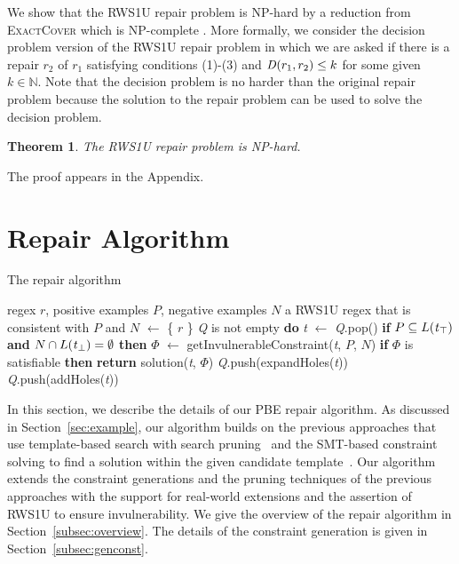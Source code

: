\documentclass[conference]{IEEEtran}
\newcommand{\distfunc}{{\it D}}
\newcommand{\queue}{{\it Q}}
\newcommand{\idt}{\hspace{0.5cm}}
\newcommand{\sstate}{{\it t}}
\newcommand{\ltp}{RWS1U}
\newcommand{\supplementary}{Appendix} \newcommand{\Supplementary}{Appendix} \newtheorem{definition}{Definition}[section]
\newtheorem{theorem}{Theorem}[section]
\begin{document}
We show that the \ltp{} repair problem is NP-hard by a reduction from \textsc{ExactCover} which is NP-complete \cite{Karp1972}.  More formally, we consider the decision problem version of the \ltp{} repair problem in which we are asked if there is a repair $r_2$ of $r_1$ satisfying conditions (1)-(3) and $\distfunc{}(r_1,r_2) \leq k$ for some given $k \in \mathbb{N}$.  Note that the decision problem is no harder than the original repair problem because the solution to the repair problem can be used to solve the decision problem.
\begin{theorem}
\label{theo:nphardness}
The \ltp{} repair problem is NP-hard.
\end{theorem}
The proof appears in the \supplementary{}.







  
\section{Repair Algorithm}
\label{sec:algo}


\begin{algorithm}[t]
\caption{The repair algorithm}
\label{alg:repair}
\begin{algorithmic}[1]
\REQUIRE regex $r$, positive examples $P$, negative examples $N$
\ENSURE a \ltp{} regex that is consistent with $P$ and $N$
\STATE \queue{} $ \leftarrow $ \{ $r$ \}
{  \queue{} is not empty {\bf do}}
\STATE \idt{} \sstate{} $\leftarrow$ \queue{}{\sf .pop()}
\STATE \idt{} {\bf if} $P \subseteq L(\sstate{}_{\top})$ {\bf and} $N \cap L(\sstate{}_{\bot}) = \emptyset$ {\bf then}
\STATE \idt{}\idt{} $\Phi$ $\leftarrow$ {\sf getInvulnerableConstraint}(\sstate{}, $P$, $N$)
\STATE \idt{}\idt{} {\bf if} $\Phi$ is satisfiable {\bf then}
\STATE \idt{}\idt{}\idt{} {\bf return} {\sf solution(\sstate{}}, $\Phi${\sf)}
\STATE \idt{}\idt{} \queue{}{\sf.push(expandHoles(\sstate{}))}
\STATE \idt{} \queue{\sf .push(addHoles(\sstate{}))}
\end{algorithmic}
\end{algorithm}
In this section, we describe the details of our PBE repair algorithm.
As discussed in Section~\ref{sec:example}, our algorithm builds on the previous approaches that use template-based search with search pruning~\cite{10.1145/3093335.2993244, 10.1145/3360565} and the SMT-based constraint solving to find a solution within the given candidate template~\cite{10.1145/3360565}.  
Our algorithm extends the constraint generations and the pruning techniques of the previous approaches with the support for real-world extensions and the assertion of \ltp{} to ensure invulnerability.
We give the overview of the repair algorithm in Section~\ref{subsec:overview}.  The details of the constraint generation is given in Section~\ref{subsec:genconst}.
\end{document}
